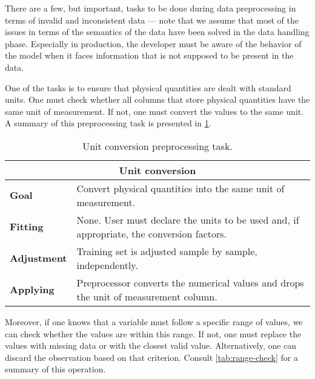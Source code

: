 There are a few, but important, tasks to be done during data preprocessing in terms of
invalid and inconsistent data --- note that we assume that most of the issues in terms of
the semantics of the data have been solved in the data handling phase.  Especially in
production, the developer must be aware of the behavior of the model when it faces
information that is not supposed to be present in the data.

One of the tasks is to ensure that physical quantities are dealt with standard units.  One must
check whether all columns that store physical quantities have the same unit of
measurement.  If not, one must convert the values to the same unit.  A summary of this
preprocessing task is presented in \cref{tab:unit-conversion}.

\begin{table}\caption{Unit conversion preprocessing task.}
  \centering
  \begin{tabular}{lp{6cm}}
    \toprule
    \multicolumn{2}{c}{\textbf{Unit conversion}} \\
    \midrule
    \textbf{Goal} &
      Convert physical quantities into the same unit of measurement. \\
    \textbf{Fitting} &
      None. User must declare the units to be used and, if appropriate, the conversion
      factors. \\
    \textbf{Adjustment} &
      Training set is adjusted sample by sample, independently. \\
    \textbf{Applying} &
      Preprocessor converts the numerical values and drops the unit of measurement column.  \\
    \bottomrule
  \end{tabular}
  \label{tab:unit-conversion}
\end{table}

Moreover, if one knows that a variable must follow a specific range of values, we can check
whether the values are within this range.  If not, one must replace the values with
missing data or with the closest valid value.  Alternatively, one can discard the
observation based on that criterion.  Consult \cref{tab:range-check} for a summary of this
operation.

